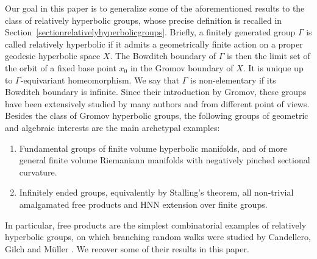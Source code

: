 \documentclass{amsart}
\theoremstyle{definition}
\theoremstyle{remark}
\newcommand{\Gx }{\mathrm{Cay}(\Gamma, S)}
\begin{document}




Our goal in this paper is to generalize some of the aforementioned results to the class of   relatively hyperbolic groups, whose precise definition is recalled   in Section~\ref{sectionrelativelyhyperbolicgroups}.
Briefly, a finitely generated group $\Gamma$ is called relatively hyperbolic if it admits a geometrically finite action on a proper geodesic hyperbolic space $X$.
The Bowditch boundary of $\Gamma$ is then the limit set of the orbit of a fixed base point $x_0$ in the Gromov boundary of $X$.
It is unique up to $\Gamma$-equivariant homeomorphism.
We say that $\Gamma$ is non-elementary if its Bowditch boundary is infinite.
Since their introduction by Gromov,  these groups have been extensively studied by many authors and from different point of views. Besides the class of Gromov hyperbolic groups, the following   groups of geometric and algebraic interests are the main archetypal examples: 
\begin{enumerate}

    \item
    Fundamental groups of finite volume hyperbolic manifolds, and of more general finite volume Riemaniann manifolds with negatively pinched sectional curvature. 
    \item
    Infinitely ended groups, equivalently by Stalling's theorem, all non-trivial amalgamated free products and HNN extension over finite groups. 

    
\end{enumerate}
In particular, free products are  the simplest combinatorial examples of relatively hyperbolic groups, on which branching random walks  were studied by Candellero, Gilch and M\"uller \cite{CandelleroGilchMuller}. 
We recover some of their results in this paper.
\end{document}
